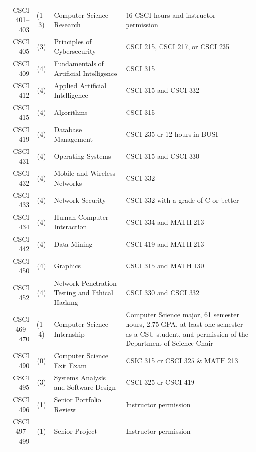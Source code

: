 \begin{reqgroup}[left*=1pt,right*=1pt,bottom=0pt]{}
\begin{tabularx}{\textwidth}{ r c l  | X }
	CSCI 401--403 & (1--3) & Computer Science Research                   & 16 CSCI hours and instructor permission \\
	CSCI 405 & (3) & Principles of Cybersecurity                         & CSCI 215, CSCI 217, or CSCI 235 \\
	CSCI 409 & (4) & Fundamentals of Artificial Intelligence             & CSCI 315 \\
	CSCI 412 & (4) & Applied Artificial Intelligence                     & CSCI 315 and CSCI 332 \\
	CSCI 415 & (4) & Algorithms                                          & CSCI 315 \\
	CSCI 419 & (4) & Database Management                         & CSCI 235 or 12 hours in BUSI \\
	CSCI 431 & (4) & Operating Systems                         & CSCI 315 and CSCI 330 \\
	CSCI 432 & (4) & Mobile and Wireless Networks                         & CSCI 332 \\
	CSCI 433 & (4) & Network Security                         & CSCI 332 with a grade of C or better \\
	CSCI 434 & (4) & Human-Computer Interaction                         & CSCI 334 and MATH 213 \\
	CSCI 442 & (4) & Data Mining                         & CSCI 419 and MATH 213 \\
	CSCI 450 & (4) & Graphics                         & CSCI 315 and MATH 130 \\
	CSCI 452 & (4) & Network Penetration Testing and Ethical Hacking    & CSCI 330 and CSCI 332 \\
	CSCI 469--470 & (1--4) & Computer Science Internship                  & Computer Science major, 61 semester hours, 2.75 GPA, at least one semester as a CSU student, and permission of the Department of Science Chair \\
	CSCI 490 & (0) & Computer Science Exit Exam                         &  CSIC 315 or CSCI 325 \& MATH 213 \\
	CSCI 495 & (3) & Systems Analysis and Software Design               & CSCI 325 or CSCI 419 \\
	CSCI 496 & (1) & Senior Portfolio Review                         & Instructor permission \\
	CSCI 497--499 & (1) & Senior Project                         & Instructor permission \\
\end{tabularx}
\end{reqgroup}

